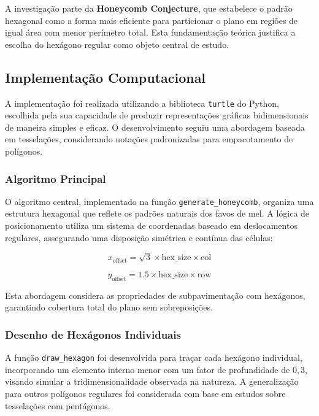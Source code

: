 \documentclass[12pt,a4paper,oneside]{extarticle}
\begin{document}
A investigação parte da \textbf{Honeycomb Conjecture}, que estabelece o padrão hexagonal como a forma mais eficiente para particionar o plano em regiões de igual área com menor perímetro total. Esta fundamentação teórica justifica a escolha do hexágono regular como objeto central de estudo.

\subsection{Implementação Computacional}

A implementação foi realizada utilizando a biblioteca \texttt{turtle} do Python, escolhida pela sua capacidade de produzir representações gráficas bidimensionais de maneira simples e eficaz. O desenvolvimento seguiu uma abordagem baseada em tesselações, considerando notações padronizadas para empacotamento de polígonos.

\subsubsection{Algoritmo Principal}

O algoritmo central, implementado na função \texttt{generate\_honeycomb}, organiza uma estrutura hexagonal que reflete os padrões naturais dos favos de mel. A lógica de posicionamento utiliza um sistema de coordenadas baseado em deslocamentos regulares, assegurando uma disposição simétrica e contínua das células:

\begin{equation}
x_{\text{offset}} = \sqrt{3} \times \text{hex\_size} \times \text{col}
\end{equation}

\begin{equation}
y_{\text{offset}} = 1.5 \times \text{hex\_size} \times \text{row}
\end{equation}

Esta abordagem considera as propriedades de subpavimentação com hexágonos, garantindo cobertura total do plano sem sobreposições.

\subsubsection{Desenho de Hexágonos Individuais}

A função \texttt{draw\_hexagon} foi desenvolvida para traçar cada hexágono individual, incorporando um elemento interno menor com um fator de profundidade de $0,3$, visando simular a tridimensionalidade observada na natureza. A generalização para outros polígonos regulares foi considerada com base em estudos sobre tesselações com pentágonos.
\end{document}
